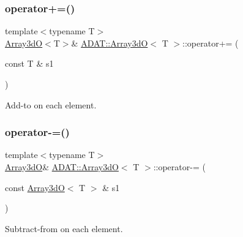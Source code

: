 \subsubsection{\texorpdfstring{operator+=()}{operator+=()}\hspace{0.1cm}{\footnotesize\ttfamily [4/4]}}
{\footnotesize\ttfamily template$<$typename T$>$ \\
\mbox{\hyperlink{classADAT_1_1Array3dO}{Array3dO}}$<$T$>$\& \mbox{\hyperlink{classADAT_1_1Array3dO}{A\+D\+A\+T\+::\+Array3dO}}$<$ T $>$\+::operator+= (\begin{DoxyParamCaption}\item[{const T \&}]{s1 }\end{DoxyParamCaption})\hspace{0.3cm}{\ttfamily [inline]}}



Add-\/to on each element. 

\mbox{\label{classADAT_1_1Array3dO_a5c840f5014264fdee101194d22f237e0}} 
\subsubsection{\texorpdfstring{operator-\/=()}{operator-=()}\hspace{0.1cm}{\footnotesize\ttfamily [1/4]}}
{\footnotesize\ttfamily template$<$typename T$>$ \\
\mbox{\hyperlink{classADAT_1_1Array3dO}{Array3dO}}\& \mbox{\hyperlink{classADAT_1_1Array3dO}{A\+D\+A\+T\+::\+Array3dO}}$<$ T $>$\+::operator-\/= (\begin{DoxyParamCaption}\item[{const \mbox{\hyperlink{classADAT_1_1Array3dO}{Array3dO}}$<$ T $>$ \&}]{s1 }\end{DoxyParamCaption})\hspace{0.3cm}{\ttfamily [inline]}}



Subtract-\/from on each element. 

\mbox{\label{classADAT_1_1Array3dO_a5c840f5014264fdee101194d22f237e0}} 
